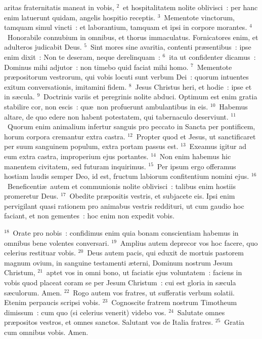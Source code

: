 \bchapter
{}aritas fraternitatis maneat in vobis,
${}^{2}$~et hospitalitatem nolite oblivisci~: per hanc enim latuerunt quidam, angelis hospitio receptis.
${}^{3}$~Mementote vinctorum, tamquam simul vincti~: et laborantium, tamquam et ipsi in corpore morantes.
${}^{4}$~Honorabile connubium in omnibus, et thorus immaculatus. Fornicatores enim, et adulteros judicabit Deus.
${}^{5}$~Sint mores sine avaritia, contenti pr\ae sentibus~: ipse enim dixit~: Non te deseram, neque derelinquam~:
${}^{6}$~ita ut confidenter dicamus~: Dominus mihi adjutor~: non timebo quid faciat mihi homo.
${}^{7}$~Mementote pr\ae positorum vestrorum, qui vobis locuti sunt verbum Dei~: quorum intuentes exitum conversationis, imitamini fidem.
${}^{8}$~Jesus Christus heri, et hodie~: ipse et in s\ae cula.
${}^{9}$~Doctrinis variis et peregrinis nolite abduci. Optimum est enim gratia stabilire cor, non escis~: qu\ae\ non profuerunt ambulantibus in eis.
${}^{10}$~Habemus altare, de quo edere non habent potestatem, qui tabernaculo deserviunt.
${}^{11}$~Quorum enim animalium infertur sanguis pro peccato in Sancta per pontificem, horum corpora cremantur extra castra.
${}^{12}$~Propter quod et Jesus, ut sanctificaret per suum sanguinem populum, extra portam passus est.
${}^{13}$~Exeamus igitur ad eum extra castra, improperium ejus portantes.
${}^{14}$~Non enim habemus hic manentem civitatem, sed futuram inquirimus.
${}^{15}$~Per ipsum ergo offeramus hostiam laudis semper Deo, id est, fructum labiorum confitentium nomini ejus.
${}^{16}$~Beneficenti\ae\ autem et communionis nolite oblivisci~: talibus enim hostiis promeretur Deus.
${}^{17}$~Obedite pr\ae positis vestris, et subjacete eis. Ipsi enim pervigilant quasi rationem pro animabus vestris reddituri, ut cum gaudio hoc faciant, et non gementes~: hoc enim non expedit vobis.


${}^{18}$~Orate pro nobis~: confidimus enim quia bonam conscientiam habemus in omnibus bene volentes conversari.
${}^{19}$~Amplius autem deprecor vos hoc facere, quo celerius restituar vobis.
${}^{20}$~Deus autem pacis, qui eduxit de mortuis pastorem magnum ovium, in sanguine testamenti \ae terni, Dominum nostrum Jesum Christum,
${}^{21}$~aptet vos in omni bono, ut faciatis ejus voluntatem~: faciens in vobis quod placeat coram se per Jesum Christum~: cui est gloria in s\ae cula s\ae culorum. Amen.
${}^{22}$~Rogo autem vos fratres, ut sufferatis verbum solatii. Etenim perpaucis scripsi vobis.
${}^{23}$~Cognoscite fratrem nostrum Timotheum dimissum~: cum quo (si celerius venerit) videbo vos.
${}^{24}$~Salutate omnes pr\ae positos vestros, et omnes sanctos. Salutant vos de Italia fratres.
${}^{25}$~Gratia cum omnibus vobis. Amen.
